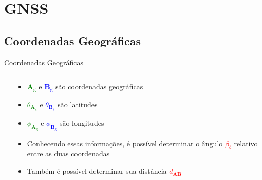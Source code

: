 \section{GNSS}
\subsection{Coordenadas Geográficas}
    \begin{frame}{Coordenadas Geográficas}
        \begin{columns}
            \begin{column}{0.55\textwidth}
                \centering
                
            \end{column}
            \begin{column}{0.45\textwidth}
                \begin{itemize}[<+(-3)->]\addtolength{\itemsep}{0.5\baselineskip}
                    \item \textcolor{Green}{$\mathbf{A}_\text{g}$} e \textcolor{Blue}{$\mathbf{B}_\text{g}$} são coordenadas geográficas
                    \item \textcolor{Green}{$\theta_{\mathbf{A}_\text{g}}$} e \textcolor{Blue}{$\theta_{\mathbf{B}_\text{g}}$} são latitudes
                    \item \textcolor{Green}{$\phi_{\mathbf{A}_\text{g}}$} e \textcolor{Blue}{$\phi_{\mathbf{B}_\text{g}}$} são longitudes
                    \item Conhecendo essas informações, é possível determinar o ângulo \textcolor{Red}{$\beta_b$} relativo entre as duas coordenadas
                    \item Também é possível determinar sua distância \textcolor{Red}{$d_\mathbf{AB}$}
                \end{itemize}
            \end{column}
        \end{columns}
    \end{frame}

